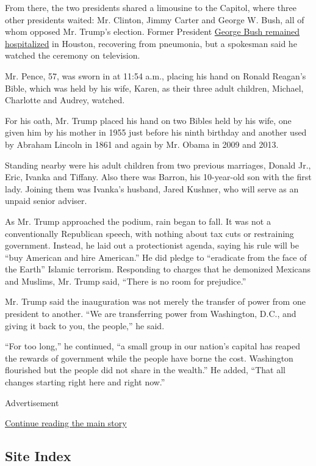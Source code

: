 From there, the two presidents shared a limousine to the Capitol, where
three other presidents waited: Mr. Clinton, Jimmy Carter and George W.
Bush, all of whom opposed Mr. Trump's election. Former President
\href{https://www.nytimes3xbfgragh.onion/2017/01/18/us/politics/george-barbara-bush-hospitalized.html}{George
Bush remained hospitalized} in Houston, recovering from pneumonia, but a
spokesman said he watched the ceremony on television.

Mr. Pence, 57, was sworn in at 11:54 a.m., placing his hand on Ronald
Reagan's Bible, which was held by his wife, Karen, as their three adult
children, Michael, Charlotte and Audrey, watched.

For his oath, Mr. Trump placed his hand on two Bibles held by his wife,
one given him by his mother in 1955 just before his ninth birthday and
another used by Abraham Lincoln in 1861 and again by Mr. Obama in 2009
and 2013.

Standing nearby were his adult children from two previous marriages,
Donald Jr., Eric, Ivanka and Tiffany. Also there was Barron, his
10-year-old son with the first lady. Joining them was Ivanka's husband,
Jared Kushner, who will serve as an unpaid senior adviser.

As Mr. Trump approached the podium, rain began to fall. It was not a
conventionally Republican speech, with nothing about tax cuts or
restraining government. Instead, he laid out a protectionist agenda,
saying his rule will be ``buy American and hire American.'' He did
pledge to ``eradicate from the face of the Earth'' Islamic terrorism.
Responding to charges that he demonized Mexicans and Muslims, Mr. Trump
said, ``There is no room for prejudice.''

Mr. Trump said the inauguration was not merely the transfer of power
from one president to another. ``We are transferring power from
Washington, D.C., and giving it back to you, the people,'' he said.

``For too long,'' he continued, ``a small group in our nation's capital
has reaped the rewards of government while the people have borne the
cost. Washington flourished but the people did not share in the
wealth.'' He added, ``That all changes starting right here and right
now.''

Advertisement

\protect\hyperlink{after-bottom}{Continue reading the main story}

\hypertarget{site-index}{%
\subsection{Site Index}\label{site-index}}

